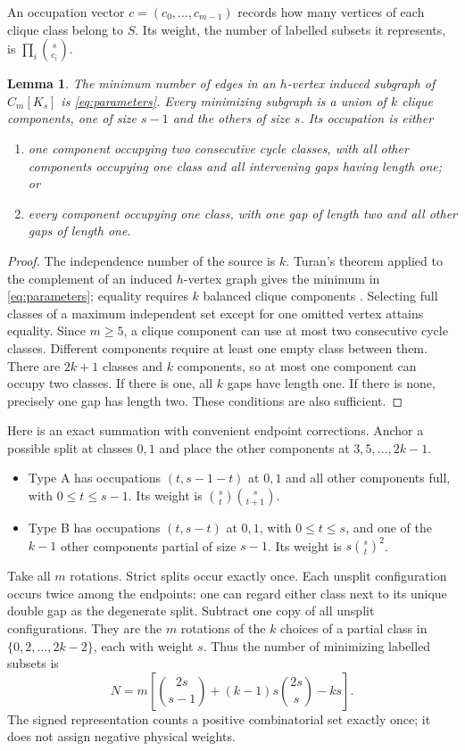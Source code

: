 \documentclass[11pt]{article}
\newtheorem{lemma}[theorem]{Lemma}
\theoremstyle{remark}\newtheorem{remark}[theorem]{Remark}
\begin{document}
An occupation vector $c=(c_0,\ldots,c_{m-1})$ records how many
vertices of each clique class belong to $S$. Its weight, the number
of labelled subsets it represents, is $\prod_i\binom{s}{c_i}$.

\begin{lemma}\label{lem:ground}
The minimum number of edges in an $h$-vertex induced subgraph of
$C_m[K_s]$ is \eqref{eq:parameters}. Every minimizing subgraph is
a union of $k$ clique components, one of size $s-1$ and the others
of size $s$. Its occupation is either
\begin{enumerate}
\item one component occupying two consecutive cycle classes, with
all other components occupying one class and all intervening gaps
having length one; or
\item every component occupying one class, with one gap of length
two and all other gaps of length one.
\end{enumerate}
\end{lemma}
\begin{proof}
The independence number of the source is $k$.
Turan's theorem applied to the complement of an induced
$h$-vertex graph gives the minimum in \eqref{eq:parameters};
equality requires $k$ balanced clique components \cite{Turan}.
Selecting full classes of a maximum independent set except for
one omitted vertex attains equality.
Since $m\ge5$, a clique component can use at most two consecutive
cycle classes. Different components require at least one empty
class between them. There are $2k+1$ classes and $k$ components,
so at most one component can occupy two classes. If there is
one, all $k$ gaps have length one. If there is none, precisely
one gap has length two. These conditions are also sufficient.
\end{proof}

Here is an exact summation with convenient endpoint corrections.
Anchor a possible split at classes $0,1$ and place the other
components at $3,5,\ldots,2k-1$.
\begin{itemize}
\item Type A has occupations $(t,s-1-t)$ at $0,1$ and all other
components full, with $0\le t\le s-1$. Its weight is
$\binom{s}{t}\binom{s}{t+1}$.
\item Type B has occupations $(t,s-t)$ at $0,1$, with
$0\le t\le s$, and one of the $k-1$ other components partial
of size $s-1$. Its weight is $s\binom{s}{t}^2$.
\end{itemize}
Take all $m$ rotations. Strict splits occur exactly once.
Each unsplit configuration occurs twice among the endpoints:
one can regard either class next to its unique double gap as
the degenerate split. Subtract one copy of all unsplit configurations.
They are the $m$ rotations of the $k$ choices of a partial class
in $\{0,2,\ldots,2k-2\}$, each with weight $s$.
Thus the number of minimizing labelled subsets is
\begin{equation}
 N=m\left[\binom{2s}{s-1}+(k-1)s\binom{2s}{s}-ks\right]. \label{eq:N}
\end{equation}
The signed representation counts a positive combinatorial set
exactly once; it does not assign negative physical weights.
\end{document}
